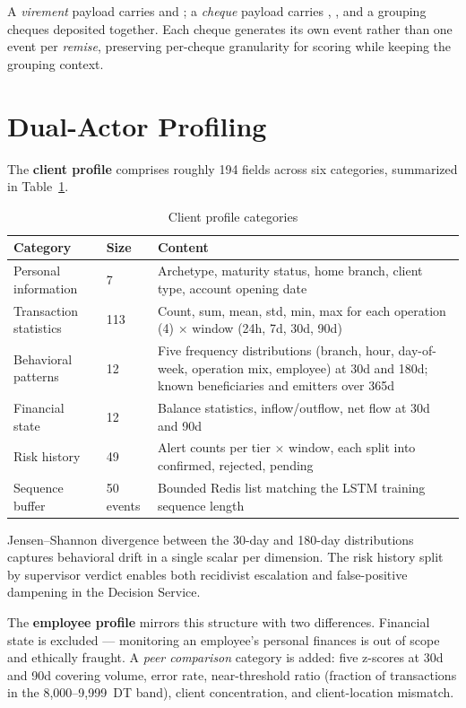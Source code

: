 A \emph{virement} payload carries  and ; a \emph{cheque} payload carries , , and a  grouping cheques deposited together. Each cheque generates its own event rather than one event per \emph{remise}, preserving per-cheque granularity for scoring while keeping the grouping context.

\section{Dual-Actor Profiling}

The \textbf{client profile} comprises roughly 194 fields across six categories, summarized in Table~\ref{tab:profile}.

\begin{table}[htbp]
\centering
\small
\caption{Client profile categories}
\label{tab:profile}
\begin{tabular}{@{}p{3.2cm}p{1.4cm}p{8.5cm}@{}}
\toprule
\textbf{Category} & \textbf{Size} & \textbf{Content} \\
\midrule
Personal information & 7 & Archetype, maturity status, home branch, client type, account opening date \\
Transaction statistics & 113 & Count, sum, mean, std, min, max for each operation (4) $\times$ window (24h, 7d, 30d, 90d) \\
Behavioral patterns & 12 & Five frequency distributions (branch, hour, day-of-week, operation mix, employee) at 30d and 180d; known beneficiaries and emitters over 365d \\
Financial state & 12 & Balance statistics, inflow/outflow, net flow at 30d and 90d \\
Risk history & 49 & Alert counts per tier $\times$ window, each split into confirmed, rejected, pending \\
Sequence buffer & 50 events & Bounded Redis list matching the LSTM training sequence length \\
\bottomrule
\end{tabular}
\end{table}

Jensen--Shannon divergence between the 30-day and 180-day distributions captures behavioral drift in a single scalar per dimension. The risk history split by supervisor verdict enables both recidivist escalation and false-positive dampening in the Decision Service.

The \textbf{employee profile} mirrors this structure with two differences. Financial state is excluded --- monitoring an employee's personal finances is out of scope and ethically fraught. A \emph{peer comparison} category is added: five z-scores at 30d and 90d covering volume, error rate, near-threshold ratio (fraction of transactions in the 8{,}000--9{,}999~DT band), client concentration, and client-location mismatch.

